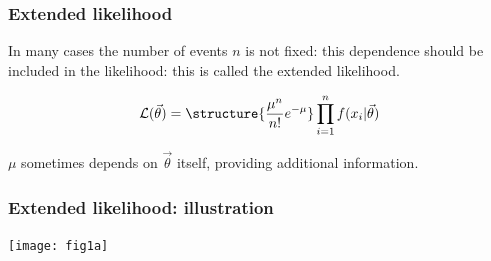 \documentclass[9pt]{beamer}
\newif\ifmyhide
\newcommand\myhide[1]{%
\ifmyhide \vspace{15pt} \begin{center} \myexample{(blackboard)}\end{center} \vspace{15pt} \else #1 \fi
}
\begin{document}
%  
% 





\begin{frame}
 \frametitle{Extended likelihood}
 
 In many cases the number of events $n$ is not fixed: this dependence should be included in the likelihood: this is called the extended likelihood.
 
 \myhide{$$\mathcal{L}(\vec{\theta}) = \structure{\frac{\mu^n}{n!}e^{-\mu}} \prod_{i=1}^{n} f(x_i | \vec{\theta})$$}
 
 $\mu$ sometimes depends on $\vec{\theta}$ itself, providing additional information.
\end{frame}

\begin{frame}
 \frametitle{Extended likelihood: illustration}
 
 
 \begin{center}
  \texttt{[image: fig1a]}
 \end{center}

\end{frame}
\end{document}
